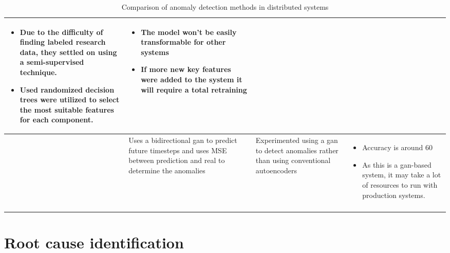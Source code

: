 \begin{longtable}{| p{20mm} | p{43mm} | p{43mm} | p{43mm} |}
  \vspace{-8mm}
  \begin{itemize}[leftmargin=*,noitemsep,nolistsep] 
    \item Due to the difficulty of finding labeled research data, they settled on using a semi-supervised technique.
    \item Used randomized decision trees were utilized to select the most suitable features for each component.
  \vspace{-7mm}
  \end{itemize} &
  \vspace{-8mm}
  \begin{itemize}[leftmargin=*,noitemsep,nolistsep] 
    \item The model won't be easily transformable for other systems
    \item If more new key features were added to the system it will require a total retraining
  \vspace{-7mm}
  \end{itemize} \\ \hline
  \cite{kumarage2019generative} &
  Uses a bidirectional \ac{gan} to predict future timesteps and uses MSE between prediction and real to determine the anomalies &
  Experimented using a \ac{gan} to detect anomalies rather than using conventional autoencoders &
  \vspace{-8mm}
  \begin{itemize}[leftmargin=*,noitemsep,nolistsep] 
    \item Accuracy is around 60%
    \item As this is a \ac{gan}-based system, it may take a lot of resources to run with production systems.
  \end{itemize} \\ \hline
  \caption{Comparison of anomaly detection methods in distributed systems}
\end{longtable}

\section{Root cause identification}


